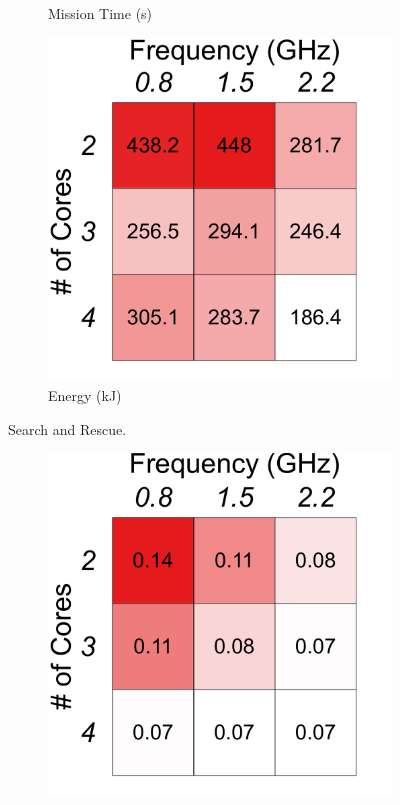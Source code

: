 {\begin{figure}[t!]
\begin{subfigure}[t!]{.3\columnwidth}
    \caption{Mission Time (s)}
    \label{fig:benchmarks:OPA:sar:time}
    \end{subfigure}
    \begin{subfigure}[t!]{.3\columnwidth}
    \centering
    \includegraphics[width=\columnwidth] {figs/SAR_energy_operating_point}
    \caption{Energy (kJ)}
     \label{fig:benchmarks:OPA:sar:energy}
    \end{subfigure}
    \caption{Search and Rescue.}
    \label{fig:benchmarks:OPA:sar}
    \end{figure}
    \begin{figure}[t!]
    \centering
    \begin{subfigure}[t!]{.3\columnwidth}
    \centering
    \includegraphics[width=\columnwidth]{figs/aerial_photography_error_operating_point}

\end{subfigure}
\end{figure}}
